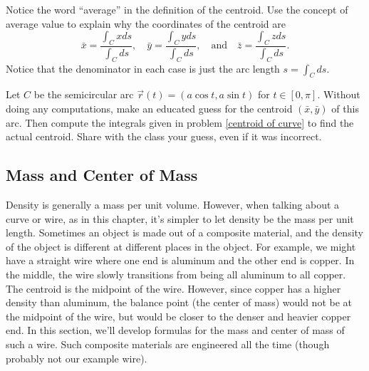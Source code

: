 \begin{problem}[Centroid]\label{centroid of curve}%
  Notice the word ``average'' in the definition of the centroid. Use the concept of average value to explain why the coordinates of the centroid are %
$$
\bar x = \frac{\int_C x ds}{\int_C  ds},\quad
\bar y = \frac{\int_C y ds}{\int_C  ds},\quad 
\text{and}\quad
\bar z = \frac{\int_C z ds}{\int_C  ds}.
$$
Notice that the denominator in each case is just the arc length $s=\int_C ds$. 
\end{problem}


\begin{problem}\label{semicircle centroid}
 Let $C$ be the semicircular arc $\vec r(t)=(a\cos t, a\sin t)$ for $t\in[0,\pi]$. Without doing any computations, make an educated guess for the centroid $(\bar x, \bar y)$ of this arc.  Then compute the integrals given in problem \ref{centroid of curve} to find the actual centroid. Share with the class your guess, even if it was incorrect. 
\end{problem}

\subsection{Mass and Center of Mass}
Density is generally a mass per unit volume.  However, when talking about a curve or wire, as in this chapter, it's simpler to let density be the mass per unit length.  Sometimes an object is made out of a composite material, and the density of the object is different at different places in the object. For example, we might have a straight wire where one end is aluminum and the other end is copper. In the middle, the wire slowly transitions from being all aluminum to all copper.  The centroid is the midpoint of the wire.  However, since copper has a higher density than aluminum, the balance point (the center of mass) would not be at the midpoint of the wire, but would be closer to the denser and heavier copper end.  In this section, we'll develop formulas for the mass and center of mass of such a wire. Such composite materials are engineered all the time (though probably not our example wire).  

